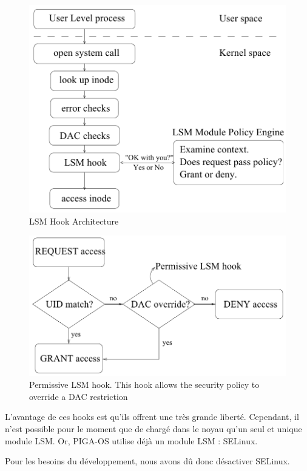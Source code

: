 \documentclass[pdftex,a4paper,titlepage,11pt,openright]{article}
\begin{document}
\begin{figure}[hb]
	\centering
	\includegraphics[scale=0.45]{lsm1.png}
	\caption{LSM Hook Architecture \cite{LSMINTRO}}
\end{figure}

\begin{figure}[hb]
	\centering
	\includegraphics[scale=0.45]{lsm2.png}
	\caption{Permissive LSM hook. This hook allows the security policy to override a DAC restriction \cite{LSMINTRO}}
\end{figure}

L'avantage de ces hooks est qu'ils offrent une très grande liberté. Cependant, il n'est possible pour le moment que de chargé dans le noyau qu'un seul et unique module LSM. Or, PIGA-OS utilise déjà un module LSM : SELinux.

Pour les besoins du développement, nous avons dû donc désactiver SELinux.
\end{document}
